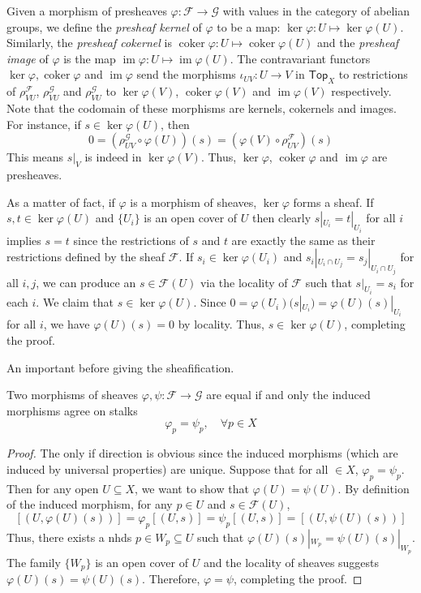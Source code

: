 \documentclass[12pt,letter]{article}
\newcommand{\coker}[0]{\operatorname{coker}}
\newcommand{\im}[0]{\operatorname{im}}
\newcommand{\Top}[0]{\mathsf{Top}}
\begin{document}
	Given a morphism of presheaves $\varphi:\mathscr F\to \mathscr G$ with values in the category of abelian groups, we define the \textit{presheaf kernel} of $\varphi$ to be a map: $\ker\varphi: U\mapsto \ker\varphi(U)$. Similarly, the \textit{presheaf cokernel} is $\coker\varphi:U\mapsto\coker\varphi(U)$ and the \textit{presheaf image} of $\varphi$ is the map $\im\varphi: U\mapsto \im\varphi(U)$. The contravariant functors $\ker\varphi,\coker\varphi$ and $\im\varphi$ send the morphisms $\iota_{UV}: U\to V$ in $\Top_X$ to restrictions of $\rho_{VU}^{\mathscr F}$, $\rho_{VU}^\mathscr G$ and $\rho_{VU}^\mathscr G$ to $\ker\varphi(V)$, $\coker\varphi(V)$ and $\im\varphi(V)$ respectively. Note that the codomain of these morphisms are kernels, cokernels and images. For instance, if $s\in\ker\varphi(U)$, then
	\[0=(\rho^\mathscr G_{UV}\circ \varphi(U))(s)=(\varphi(V)\circ \rho^\mathscr F_{UV})(s)\]
	This means $s|_V$ is indeed in $\ker\varphi(V)$. Thus, $\ker\varphi$, $\coker\varphi$ and $\im\varphi$ are presheaves.
	
	As a matter of fact, if $\varphi$ is a morphism of sheaves, $\ker\varphi$ forms a sheaf. If $s,t\in\ker\varphi(U)$ and $\{U_i\}$ is an open cover of $U$ then clearly $s|_{U_i}=t|_{U_i}$ for all $i$ implies $s=t$ since the restrictions of $s$ and $t$ are exactly the same as their restrictions defined by the sheaf $\mathscr F$. If $s_i\in \ker\varphi(U_i)$ and $s_i|_{U_i\cap U_j}=s_j|_{U_i\cap U_j}$ for all $i, j$, we can produce an $s\in \mathscr F(U)$ via the locality of $\mathscr F$ such that $s|_{U_i}=s_i$ for each $i$. We claim that $s\in \ker\varphi(U)$. Since $0=\varphi(U_i)(s|_{U_i})=\varphi(U)(s)|_{U_i}$ for all $i$, we have $\varphi(U)(s)=0$ by locality. Thus, $s\in \ker\varphi(U)$, completing the proof.
	
	An important before giving the sheafification.
	\begin{lemma}\label{l121}
	Two morphisms of sheaves $\varphi,\psi:\mathscr F\to\mathscr G$ are equal if and only the induced morphisms agree on stalks
	\[\varphi_p=\psi_p,\quad\forall p\in X\]
	\end{lemma}
	\begin{proof}
	The only if direction is obvious since the induced morphisms (which are induced by universal properties) are unique. Suppose that for all $\in X$, $\varphi_p=\psi_p$. Then for any open $U\subseteq X$, we want to show that $\varphi(U)=\psi(U)$. By definition of the induced morphism, for any $p\in U$ and $s\in\mathscr F(U)$,
	\[[(U, \varphi(U)(s))]=\varphi_p[(U, s)]=\psi_p[(U, s)]=[(U, \psi(U)(s))]\]
	Thus, there exists a nhds $p\in W_p\subseteq U$ such that $\varphi(U)(s)|_{W_p}=\psi(U)(s)|_{W_p}$. The family $\{W_p\}$ is an open cover of $U$ and the locality of sheaves suggests $\varphi(U)(s)=\psi(U)(s)$. Therefore, $\varphi=\psi$, completing the proof.
	\end{proof}
	
\end{document}
